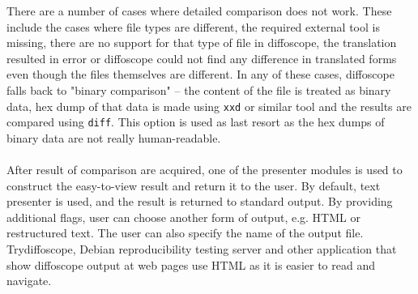 There are a number of cases where detailed comparison does not work. These include the cases where file types are different, the required external tool is missing, there are no support for that type of file in diffoscope, the translation resulted in error or diffoscope could not find any difference in translated forms even though the files themselves are different. In any of these cases, diffoscope falls back to "binary comparison" -- the content of the file is treated as binary data, hex dump of that data is made using \texttt{xxd} or similar tool and the results are compared using \texttt{diff}. This option is used as last resort as the hex dumps of binary data are not really human-readable.\\\\
After result of comparison are acquired, one of the presenter modules is used to construct the easy-to-view result and return it to the user. By default, text presenter is used, and the result is returned to standard output. By providing additional flags, user can choose another form of output, e.g. HTML or restructured text. The user can also specify the name of the output file. Trydiffoscope, Debian reproducibility testing server and other application that show diffoscope output at web pages use HTML as it is easier to read and navigate.


